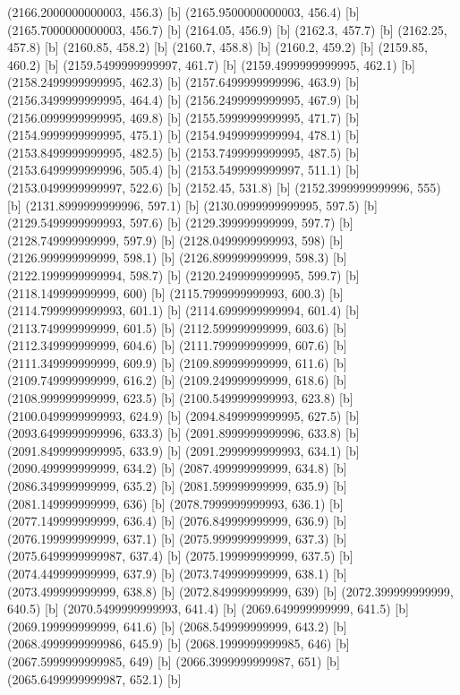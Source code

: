 {{{(2166.2000000000003, 456.3) [b] 
(2165.9500000000003, 456.4) [b] 
(2165.7000000000003, 456.7) [b] 
(2164.05, 456.9) [b] 
(2162.3, 457.7) [b] 
(2162.25, 457.8) [b] 
(2160.85, 458.2) [b] 
(2160.7, 458.8) [b] 
(2160.2, 459.2) [b] 
(2159.85, 460.2) [b] 
(2159.5499999999997, 461.7) [b] 
(2159.4999999999995, 462.1) [b] 
(2158.2499999999995, 462.3) [b] 
(2157.6499999999996, 463.9) [b] 
(2156.3499999999995, 464.4) [b] 
(2156.2499999999995, 467.9) [b] 
(2156.0999999999995, 469.8) [b] 
(2155.5999999999995, 471.7) [b] 
(2154.9999999999995, 475.1) [b] 
(2154.9499999999994, 478.1) [b] 
(2153.8499999999995, 482.5) [b] 
(2153.7499999999995, 487.5) [b] 
(2153.6499999999996, 505.4) [b] 
(2153.5499999999997, 511.1) [b] 
(2153.0499999999997, 522.6) [b] 
(2152.45, 531.8) [b] 
(2152.3999999999996, 555) [b] 
(2131.8999999999996, 597.1) [b] 
(2130.0999999999995, 597.5) [b] 
(2129.5499999999993, 597.6) [b] 
(2129.399999999999, 597.7) [b] 
(2128.749999999999, 597.9) [b] 
(2128.0499999999993, 598) [b] 
(2126.999999999999, 598.1) [b] 
(2126.899999999999, 598.3) [b] 
(2122.1999999999994, 598.7) [b] 
(2120.2499999999995, 599.7) [b] 
(2118.149999999999, 600) [b] 
(2115.7999999999993, 600.3) [b] 
(2114.7999999999993, 601.1) [b] 
(2114.6999999999994, 601.4) [b] 
(2113.749999999999, 601.5) [b] 
(2112.599999999999, 603.6) [b] 
(2112.349999999999, 604.6) [b] 
(2111.799999999999, 607.6) [b] 
(2111.349999999999, 609.9) [b] 
(2109.899999999999, 611.6) [b] 
(2109.749999999999, 616.2) [b] 
(2109.249999999999, 618.6) [b] 
(2108.999999999999, 623.5) [b] 
(2100.5499999999993, 623.8) [b] 
(2100.0499999999993, 624.9) [b] 
(2094.8499999999995, 627.5) [b] 
(2093.6499999999996, 633.3) [b] 
(2091.8999999999996, 633.8) [b] 
(2091.8499999999995, 633.9) [b] 
(2091.2999999999993, 634.1) [b] 
(2090.499999999999, 634.2) [b] 
(2087.499999999999, 634.8) [b] 
(2086.349999999999, 635.2) [b] 
(2081.599999999999, 635.9) [b] 
(2081.149999999999, 636) [b] 
(2078.7999999999993, 636.1) [b] 
(2077.149999999999, 636.4) [b] 
(2076.849999999999, 636.9) [b] 
(2076.199999999999, 637.1) [b] 
(2075.999999999999, 637.3) [b] 
(2075.6499999999987, 637.4) [b] 
(2075.199999999999, 637.5) [b] 
(2074.449999999999, 637.9) [b] 
(2073.749999999999, 638.1) [b] 
(2073.499999999999, 638.8) [b] 
(2072.849999999999, 639) [b] 
(2072.399999999999, 640.5) [b] 
(2070.5499999999993, 641.4) [b] 
(2069.649999999999, 641.5) [b] 
(2069.199999999999, 641.6) [b] 
(2068.549999999999, 643.2) [b] 
(2068.4999999999986, 645.9) [b] 
(2068.1999999999985, 646) [b] 
(2067.5999999999985, 649) [b] 
(2066.3999999999987, 651) [b] 
(2065.6499999999987, 652.1) [b] 
}}}
